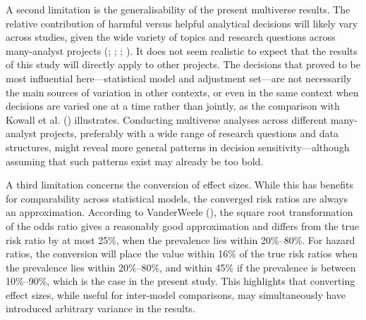 \documentclass[
  man,
  floatsintext,
  longtable,
  nolmodern,
  notxfonts,
  notimes,
  colorlinks=true,linkcolor=blue,citecolor=blue,urlcolor=blue]{apa7}
\begin{document}
A second limitation is the generalisability of the present multiverse
results. The relative contribution of harmful versus helpful analytical
decisions will likely vary across studies, given the wide variety of
topics and research questions across many-analyst projects
(;
; ; ). It
does not seem realistic to expect that the results of this study will
directly apply to other projects. The decisions that proved to be most
influential here---statistical model and adjustment set---are not
necessarily the main sources of variation in other contexts, or even in
the same context when decisions are varied one at a time rather than
jointly, as the comparison with Kowall et al.
() illustrates. Conducting
multiverse analyses across different many-analyst projects, preferably
with a wide range of research questions and data structures, might
reveal more general patterns in decision sensitivity---although assuming
that such patterns exist may already be too bold.

A third limitation concerns the conversion of effect sizes. While this
has benefits for comparability across statistical models, the converged
risk ratios are always an approximation. According to VanderWeele
(), the square root
transformation of the odds ratio gives a reasonably good approximation
and differs from the true risk ratio by at most 25\%, when the
prevalence lies within 20\%--80\%. For hazard ratios, the conversion
will place the value within 16\% of the true risk ratios when the
prevalence lies within 20\%--80\%, and within 45\% if the prevalence is
between 10\%--90\%, which is the case in the present study. This
highlights that converting effect sizes, while useful for inter-model
comparisons, may simultaneously have introduced arbitrary variance in
the results.
\end{document}
